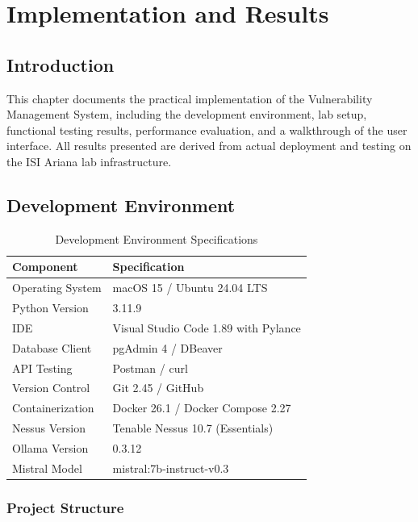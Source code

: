 \chapter{Implementation and Results}
\label{chap:implementation}

\section{Introduction}

This chapter documents the practical implementation of the Vulnerability Management System, including the development environment, lab setup, functional testing results, performance evaluation, and a walkthrough of the user interface. All results presented are derived from actual deployment and testing on the ISI Ariana lab infrastructure.

\section{Development Environment}

\begin{table}[H]
\centering
\caption{Development Environment Specifications}
\label{tab:devenv}
\begin{tabular}{ll}
\toprule
\textbf{Component} & \textbf{Specification} \\
\midrule
Operating System & macOS 15 / Ubuntu 24.04 LTS \\
Python Version & 3.11.9 \\
IDE & Visual Studio Code 1.89 with Pylance \\
Database Client & pgAdmin 4 / DBeaver \\
API Testing & Postman / curl \\
Version Control & Git 2.45 / GitHub \\
Containerization & Docker 26.1 / Docker Compose 2.27 \\
Nessus Version & Tenable Nessus 10.7 (Essentials) \\
Ollama Version & 0.3.12 \\
Mistral Model & mistral:7b-instruct-v0.3 \\
\bottomrule
\end{tabular}
\end{table}

\subsection{Project Structure}

